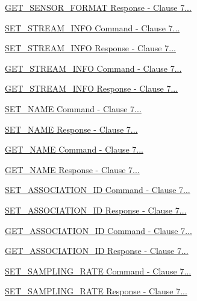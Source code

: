 \begin{DoxyCompactItemize}
\item 
\hyperlink{group__command__get__sensor__format__response}{G\+E\+T\+\_\+\+S\+E\+N\+S\+O\+R\+\_\+\+F\+O\+R\+M\+A\+T Response -\/ Clause 7...}
\item 
\hyperlink{group__command__set__stream__info}{S\+E\+T\+\_\+\+S\+T\+R\+E\+A\+M\+\_\+\+I\+N\+F\+O Command -\/ Clause 7...}
\item 
\hyperlink{group__command__set__stream__info__response}{S\+E\+T\+\_\+\+S\+T\+R\+E\+A\+M\+\_\+\+I\+N\+F\+O Response -\/ Clause 7...}
\item 
\hyperlink{group__command__get__stream__info}{G\+E\+T\+\_\+\+S\+T\+R\+E\+A\+M\+\_\+\+I\+N\+F\+O Command -\/ Clause 7...}
\item 
\hyperlink{group__command__get__stream__info__response}{G\+E\+T\+\_\+\+S\+T\+R\+E\+A\+M\+\_\+\+I\+N\+F\+O Response -\/ Clause 7...}
\item 
\hyperlink{group__command__set__name}{S\+E\+T\+\_\+\+N\+A\+M\+E Command -\/ Clause 7...}
\item 
\hyperlink{group__command__set__name__response}{S\+E\+T\+\_\+\+N\+A\+M\+E Response -\/ Clause 7...}
\item 
\hyperlink{group__command__get__name}{G\+E\+T\+\_\+\+N\+A\+M\+E Command -\/ Clause 7...}
\item 
\hyperlink{group__command__get__name__response}{G\+E\+T\+\_\+\+N\+A\+M\+E Response -\/ Clause 7...}
\item 
\hyperlink{group__command__set__association__id}{S\+E\+T\+\_\+\+A\+S\+S\+O\+C\+I\+A\+T\+I\+O\+N\+\_\+\+I\+D Command -\/ Clause 7...}
\item 
\hyperlink{group__command__set__association__id__response}{S\+E\+T\+\_\+\+A\+S\+S\+O\+C\+I\+A\+T\+I\+O\+N\+\_\+\+I\+D Response -\/ Clause 7...}
\item 
\hyperlink{group__command__get__association__id}{G\+E\+T\+\_\+\+A\+S\+S\+O\+C\+I\+A\+T\+I\+O\+N\+\_\+\+I\+D Command -\/ Clause 7...}
\item 
\hyperlink{group__command__get__association__id__response}{G\+E\+T\+\_\+\+A\+S\+S\+O\+C\+I\+A\+T\+I\+O\+N\+\_\+\+I\+D Response -\/ Clause 7...}
\item 
\hyperlink{group__command__set__sampling__rate}{S\+E\+T\+\_\+\+S\+A\+M\+P\+L\+I\+N\+G\+\_\+\+R\+A\+T\+E Command -\/ Clause 7...}
\item 
\hyperlink{group__command__set__sampling__rate__response}{S\+E\+T\+\_\+\+S\+A\+M\+P\+L\+I\+N\+G\+\_\+\+R\+A\+T\+E Response -\/ Clause 7...}

\end{DoxyCompactItemize}
